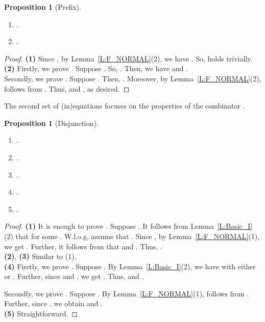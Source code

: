\documentclass{elsarticle}
\theoremstyle{plain}
\newtheorem{proposition}[theorem]{Proposition}
\theoremstyle{definition}
\begin{document}
\begin{proposition}[Prefix]\label{S:PREFIX}\hfill
    \begin{enumerate}
      \item .
      \item .
    \end{enumerate}
\end{proposition}
\begin{proof}
\noindent \textbf{(1) }  Since , by Lemma~\ref{L:F_NORMAL}(2), we have . So,  holds trivially.\\

\noindent \textbf{(2)} Firstly, we prove . Suppose . So, .
Then, we have  and .\\

Secondly, we prove .
Suppose .
Then, .
Moreover, by Lemma~\ref{L:F_NORMAL}(2),  follows from  .
Thus,  and , as desired.
\end{proof}

The second set of (in)equations focuses on the properties of the combinator .

\begin{proposition}[Disjunction]\label{S:DISJUNCTION}\hfill
    \begin{enumerate}
      \item .
      \item .
      \item .
      \item .
      \item .
    \end{enumerate}
\end{proposition}
\begin{proof}
\noindent \textbf{(1)} It is enough to prove .
    Suppose .
    It follows from Lemma~\ref{L:Basic_I}(2) that  for some .
    W.l.o.g, assume that .
    Since , by Lemma~\ref{L:F_NORMAL}(1), we get .
    Further, it follows from  that  and . Thus,  .\\

\noindent \textbf{(2)}, \textbf{(3)} Similar to (1).\\

\noindent \textbf{(4)} Firstly, we prove .
Suppose .
By Lemma~\ref{L:Basic_I}(2), we have  with either  or . Further, since  and , we get .
    Thus,  and .

Secondly, we prove .
    Suppose  .
    By Lemma~\ref{L:F_NORMAL}(1),  follows from .
    Further, since ,
    we obtain  and .\\

\noindent \textbf{(5)} Straightforward.
\end{proof}
\end{document}
